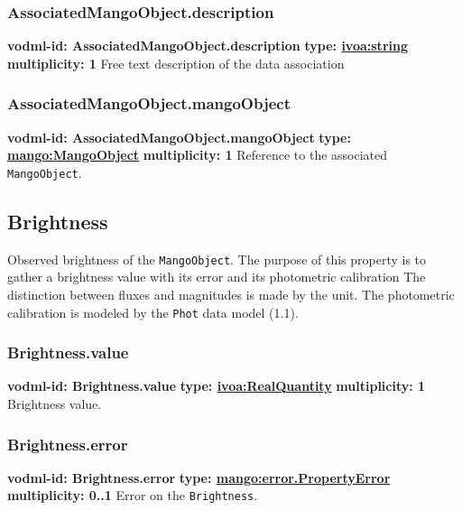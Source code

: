     \subsubsection{AssociatedMangoObject.description}
      \textbf{vodml-id: AssociatedMangoObject.description} \newline
      \textbf{type: \hyperref[sect:ivoa]{ivoa:string}} \newline
      \textbf{multiplicity: 1} \newline
      Free text description of the data association

    \subsubsection{AssociatedMangoObject.mangoObject}
      \textbf{vodml-id: AssociatedMangoObject.mangoObject} \newline
      \textbf{type: \hyperref[sect:MangoObject]{mango:MangoObject}} \newline
      \textbf{multiplicity: 1} \newline
      Reference to the associated \texttt{MangoObject}.

  \subsection{Brightness}
  \label{sect:Brightness}
    Observed brightness of the \texttt{MangoObject}. The purpose of this property is to gather a brightness value with its error and its photometric calibration The distinction between fluxes and magnitudes is made by the unit. The photometric calibration is modeled by the \texttt{Phot} data model (1.1).

    \subsubsection{Brightness.value}
      \textbf{vodml-id: Brightness.value} \newline
      \textbf{type: \hyperref[sect:ivoa]{ivoa:RealQuantity}} \newline
      \textbf{multiplicity: 1} \newline
      Brightness value.

    \subsubsection{Brightness.error}
      \textbf{vodml-id: Brightness.error} \newline
      \textbf{type: \hyperref[sect:error.PropertyError]{mango:error.PropertyError}} \newline
      \textbf{multiplicity: 0..1} \newline
      Error on the \texttt{Brightness}.

